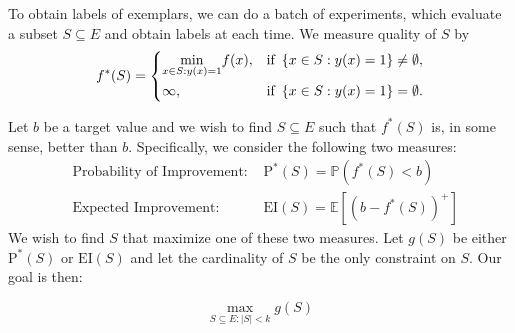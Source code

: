 \documentclass[12pt]{article}
\newcommand{\E}{\mathbb{E}}
\newcommand{\EI}{\mathrm{EI}}
\newcommand{\PI}{\text{P}^*}
\begin{document}
To obtain labels of exemplars, we can do a batch of experiments, which evaluate a subset $S \subseteq E$ and obtain labels at each time. We measure quality of $S$ by
\begin{equation} \label{eq:fS}
f^*(S)= \begin{dcases}
 \underset{x \in S:y(x)=1}{\min} f(x), & \text{if \,} \{x \in S:y(x)=1\} \neq \emptyset, \\
 \infty,  & \text{if \,} \{x \in S:y(x)=1\} = \emptyset.
 \end{dcases}
\end{equation}

%
%

Let $b$ be a target value and we wish to find $S\subseteq E$ such that $f^*(S)$ is, in some sense, better than $b$. Specifically, we consider the following two measures:
\begin{equation} \label{eq:twomeasure}
\begin{aligned}
&\text{Probability of Improvement: }&\PI(S) = \mathbb{P}(f^*(S) < b)\\
&\text{Expected Improvement: }&\EI(S) = \E [(b-f^*(S))^+]
\end{aligned}
\end{equation}
We wish to find $S$ that maximize one of these two measures. Let $g(S)$ be either $\PI(S)$ or $\EI(S)$ and let the cardinality of $S$ be the only constraint on $S$. Our goal is then:

\begin{equation} \label{eq:opt}
\max_{S\subseteq E:|S|<k}g(S)
\end{equation}
\end{document}

